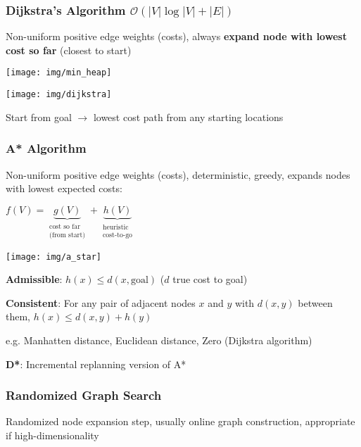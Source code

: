 \documentclass[fontsize=6pt]{scrartcl}
\begin{document}
\begin{multicols*}{4}
\subsubsection*{Dijkstra's Algorithm $\mathcal{O} (|V|\log|V| + |E|)$}
Non-uniform positive edge weights (costs), always \textbf{expand node with lowest cost so far} (closest to start)

\begin{minipage}{0.5\linewidth}
	\texttt{[image: img/min\_heap]}
\end{minipage}
\begin{minipage}{0.5\linewidth}
	\texttt{[image: img/dijkstra]}
\end{minipage}

Start from goal $\rightarrow$ lowest cost path from any starting locations

\subsubsection*{A* Algorithm }


\begin{minipage}{0.55\linewidth}
	Non-uniform positive edge weights (costs), deterministic, greedy, expands nodes with lowest expected costs:
	
	{\centering
	$f(V) = \underbrace{g(V)}_{\substack{\text{cost so far} \\
			\text{(from start)}}}
	+ \underbrace{h(V)}_{\substack{
			\text{heuristic} \\ \text{cost-to-go}
		}
	}$
	\par}
\end{minipage}
\begin{minipage}{0.45\linewidth}
	\texttt{[image: img/a\_star]}
\end{minipage}

\textbf{Admissible}: $h(x) \leq d(x,\text{goal})$ ($d$ true cost to goal)

\textbf{Consistent}: For any pair of adjacent nodes $x$ and $y$ with $d(x,y)$ between them, $ h(x) \leq d(x,y) + h(y)$


e.g. Manhatten distance, Euclidean distance, Zero (Dijkstra algorithm)

\textbf{D*}: Incremental replanning version of A*

\subsubsection*{Randomized Graph Search}
Randomized node expansion step,	usually online graph construction, appropriate if high-dimensionality


\end{multicols*}
\end{document}
